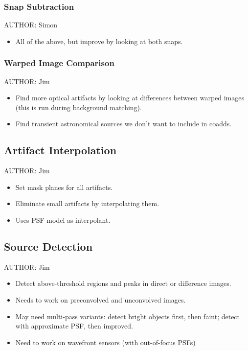 \subsubsection{Snap Subtraction}
\label{sec:acSnapSubtraction}
AUTHOR: Simon
\begin{itemize}
\item All of the above, but improve by looking at both snaps.
\end{itemize}

\subsubsection{Warped Image Comparison}
\label{sec:acWarpedImageArtifactDetection}
AUTHOR: Jim
\begin{itemize}
\item Find more optical artifacts by looking at differences between warped images (this is run during background matching).
\item Find transient astronomical sources we don't want to include in coadds.
\end{itemize}

\subsection{Artifact Interpolation}
\label{sec:acArtifactInterpolation}
AUTHOR: Jim
\begin{itemize}
\item Set mask planes for all artifacts.
\item Eliminate small artifacts by interpolating them.
\item Uses PSF model as interpolant.
\end{itemize}

\subsection{Source Detection}
\label{sec:acSourceDetection}
AUTHOR: Jim
\begin{itemize}
\item Detect above-threshold regions and peaks in direct or difference images.
\item Needs to work on preconvolved and unconvolved images.
\item May need multi-pass variants: detect bright objects first, then faint; detect with approximate PSF, then improved.
\item Need to work on wavefront sensors (with out-of-focus PSFs)
\end{itemize}

